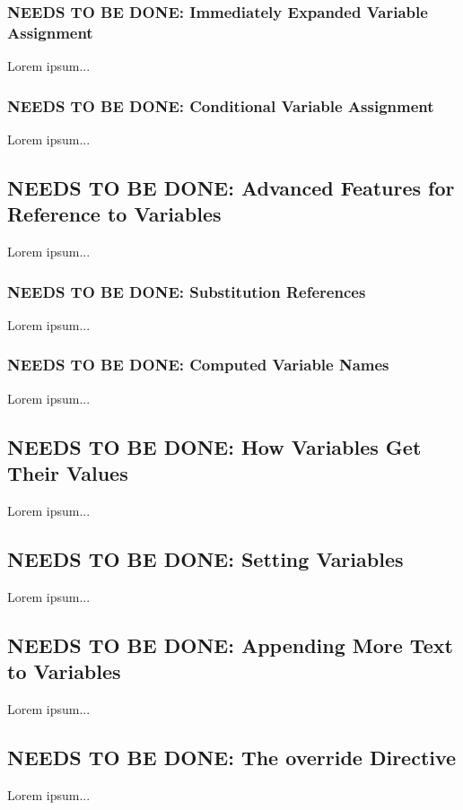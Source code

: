 \documentclass{charun}
\begin{document}
\begin{multicols*}{2}
\color{gray}
\subsubsection{NEEDS TO BE DONE: Immediately Expanded Variable Assignment}
Lorem ipsum...
\color{black}

\color{gray}
\subsubsection{NEEDS TO BE DONE: Conditional Variable Assignment}
Lorem ipsum...
\color{black}

\color{gray}
\subsection{NEEDS TO BE DONE: Advanced Features for Reference to Variables}
Lorem ipsum...
\color{black}

\color{gray}
\subsubsection{NEEDS TO BE DONE: Substitution References}
Lorem ipsum...
\color{black}

\color{gray}
\subsubsection{NEEDS TO BE DONE: Computed Variable Names}
Lorem ipsum...
\color{black}

\color{gray}
\subsection{NEEDS TO BE DONE: How Variables Get Their Values}
Lorem ipsum...
\color{black}

\color{gray}
\subsection{NEEDS TO BE DONE: Setting Variables}
Lorem ipsum...
\color{black}

\color{gray}
\subsection{NEEDS TO BE DONE: Appending More Text to Variables}
Lorem ipsum...
\color{black}

\color{gray}
\subsection{NEEDS TO BE DONE: The override Directive}
Lorem ipsum...
\color{black}


\end{multicols*}
\end{document}
